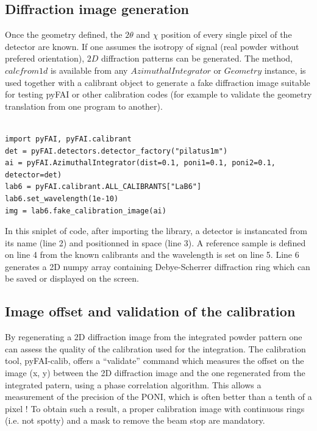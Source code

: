 \documentclass[preprint]{iucr}
\begin{document}
\subsection{Diffraction image generation}

Once the geometry defined, the $2\theta$ and $\chi$ position of every single
pixel of the detector are known.
If one assumes the isotropy of signal (real powder without prefered
orientation), $2D$ diffraction patterns can be generated.
The method, $calcfrom1d$ is available from any $Azimuthal Integrator$ or
$Geometry$ instance, is used together with a calibrant object
to generate a fake diffraction image suitable for testing pyFAI or other 
calibration codes (for example to validate the geometry translation from one
program to another).

\begin{verbatim}

import pyFAI, pyFAI.calibrant
det = pyFAI.detectors.detector_factory("pilatus1m")
ai = pyFAI.AzimuthalIntegrator(dist=0.1, poni1=0.1, poni2=0.1, detector=det)
lab6 = pyFAI.calibrant.ALL_CALIBRANTS["LaB6"]
lab6.set_wavelength(1e-10)
img = lab6.fake_calibration_image(ai)
\end{verbatim}

In this sniplet of code, after importing the library, a detector is instancated
from its name (line 2) and positionned in space (line 3).
A reference sample is defined on line 4 from the known calibrants and the
wavelength is set on line 5. Line 6 generates a 2D numpy array containing
Debye-Scherrer diffraction ring which can be saved or displayed on the screen.

\subsection{Image offset and validation of the calibration}
By regenerating a 2D diffraction image from the integrated powder pattern one
can assess the quality of the calibration used for the integration.
The calibration tool, pyFAI-calib, offers  a ``validate'' command which measures
the offset on the image (x, y) between the 2D diffraction image and the one
regenerated from the integrated patern, using a phase correlation algorithm.
This allows a measurement of the precision of the PONI, which is often better
than a tenth of a pixel !
To obtain such a result, a proper calibration image with continuous rings (i.e.
not spotty) and a mask to remove the beam stop are mandatory.
\end{document}
